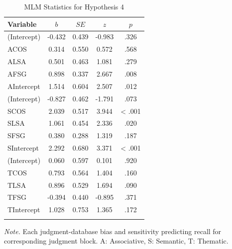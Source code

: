 \documentclass[english,man]{apa6}
\theoremstyle{definition}
\theoremstyle{definition}
\theoremstyle{remark}
\begin{document}
\begin{table}[tbp]
\begin{center}
\begin{threeparttable}
\caption{\label{tab:hyp4-table}MLM Statistics for Hypothesis 4}
\begin{tabular}{lcccc}
\toprule
Variable & \multicolumn{1}{c}{$b$} & \multicolumn{1}{c}{$SE$} & \multicolumn{1}{c}{$z$} & \multicolumn{1}{c}{$p$}\\
\midrule
(Intercept) & -0.432 & 0.439 & -0.983 & .326\\
ACOS & 0.314 & 0.550 & 0.572 & .568\\
ALSA & 0.501 & 0.463 & 1.081 & .279\\
AFSG & 0.898 & 0.337 & 2.667 & .008\\
AIntercept & 1.514 & 0.604 & 2.507 & .012\\
(Intercept) & -0.827 & 0.462 & -1.791 & .073\\
SCOS & 2.039 & 0.517 & 3.944 & < .001\\
SLSA & 1.061 & 0.454 & 2.336 & .020\\
SFSG & 0.380 & 0.288 & 1.319 & .187\\
SIntercept & 2.292 & 0.680 & 3.371 & < .001\\
(Intercept) & 0.060 & 0.597 & 0.101 & .920\\
TCOS & 0.793 & 0.564 & 1.404 & .160\\
TLSA & 0.896 & 0.529 & 1.694 & .090\\
TFSG & -0.394 & 0.440 & -0.895 & .371\\
TIntercept & 1.028 & 0.753 & 1.365 & .172\\
\bottomrule
\addlinespace
\end{tabular}
\begin{tablenotes}[para]
\textit{Note.} Each judgment-database bias and sensitivity predicting recall for corresponding judgment block. A: Associative, S: Semantic, T: Thematic.
\end{tablenotes}
\end{threeparttable}
\end{center}
\end{table}
\end{document}
